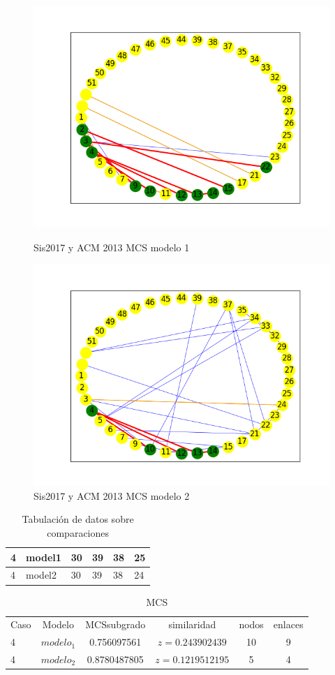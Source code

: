 \begin{figure}[H]
\centering
\includegraphics[width=0.7\linewidth]{images/sis2018/H_sis2018_cmp_acm2013_m1_mcs_mix}
\caption{Sis2017 y ACM 2013 MCS modelo 1}
\label{fig:c4p2modelo1}


\includegraphics[width=0.7\linewidth]{images/sis2018/H_sis2018_cmp_acm2013_m2_mcs_mix}
\caption{Sis2017 y ACM 2013 MCS modelo 2}
\label{fig:c4p2modelo2}

\end{figure}


\begin{table}[H]
\centering
\caption{Tabulación de datos sobre comparaciones}
\begin{tabular}[t]{|l|l|l|l|l|l|}
\hline
4&model1&30&39&38&25\\
\hline
4&model2&30&39&38&24\\
\hline
\end{tabular}
\label{tab:tabcomparaciones_C4}
\end{table}


\begin{table}[H]
\centering
\caption{MCS}
\begin{tabular}[t]{lccccc}
\hline
Caso & Modelo & MCSsubgrado & similaridad & nodos & enlaces \\
4 & $modelo_1$ & 0.756097561 & $z=0.243902439$ & 10 & 9\\
4 & $modelo_2$ & 0.8780487805 & $z=0.1219512195$ & 5 & 4\\
\hline
\end{tabular}
\label{tab:tabcomparaciones_C4_P2}
\end{table}

